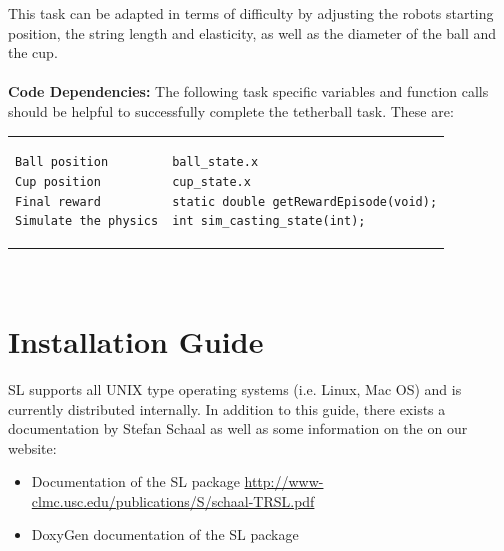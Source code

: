 \documentclass[11pt, article, colorback]{article}
\begin{document}
This task can be adapted in terms of difficulty by adjusting the robots starting position, the string length and elasticity, as well as the 
diameter of the ball and the cup. 
\\ \\ 
%
\textbf{Code Dependencies:} The following task specific variables and function calls should be helpful to 
successfully complete the tetherball task. These are: \\
\begin{tabular}{ m{7cm} m{4cm}}
\begin{lstlisting}
Ball position
Cup position
Final reward
Simulate the physics
\end{lstlisting}
& \begin{lstlisting}
ball_state.x
cup_state.x
static double getRewardEpisode(void);
int sim_casting_state(int);
\end{lstlisting}
\end{tabular} \\


\newpage
\appendix

\section{Installation Guide}
SL supports all UNIX type operating systems (i.e. Linux, Mac OS) and is currently distributed internally. In addition to this guide, there exists a documentation by Stefan Schaal as well as some information on the on our website:

\begin{itemize}
  \item Documentation of the SL package \url{http://www-clmc.usc.edu/publications/S/schaal-TRSL.pdf}
  \item DoxyGen documentation of the SL package 
\end{itemize}
\end{document}
